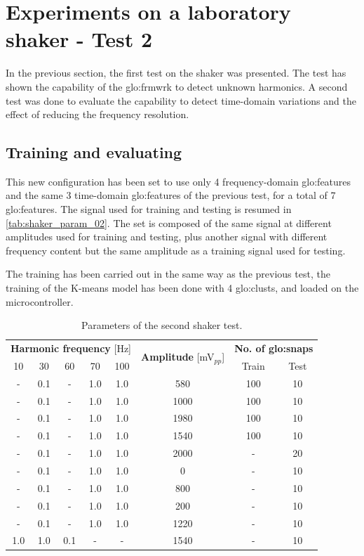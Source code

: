\section{Experiments on a laboratory shaker - Test 2}
\label{sec:shaker_test02}
In the previous section, the first test on the shaker was presented. The test has shown the capability of the \gls{glo:frmwrk} to detect unknown harmonics. A second test was done to evaluate the capability to detect time-domain variations and the effect of reducing the frequency resolution. 

\subsection{Training and evaluating}
This new configuration has been set to use only 4 frequency-domain \gls{glo:feature}s and the same 3 time-domain \gls{glo:feature}s of the previous test, for a total of 7 \gls{glo:feature}s. The signal used for training and testing is resumed in \autoref{tab:shaker_param_02}. The set is composed of the same signal at different amplitudes used for training and testing, plus another signal with different frequency content but the same amplitude as a training signal used for testing. 

The training has been carried out in the same way as the previous test, the training of the K-means model has been done with 4 \gls{glo:clust}s, and loaded on the microcontroller. 

\begin{table}
    \centering
    \caption{Parameters of the second shaker test.}
    \label{tab:shaker_param_02}
    \begin{tabular}{cccccccc} 
    \toprule
    \multicolumn{5}{c}{\textbf{Harmonic frequency} {[}Hz]} & \multirow{2}{*}{\textbf{Amplitude }{[}mV$_{pp}$]} & \multicolumn{2}{c}{\textbf{ No. of \gls{glo:snap}s}} \\
    10 & 30 & 60 & 70 & 100 &  & Train & Test \\ 
    \hline
    - & 0.1 & - & 1.0 & 1.0 & 580 & 100 & 10 \\
    - & 0.1 & - & 1.0 & 1.0 & 1000 & 100 & 10 \\
    - & 0.1 & - & 1.0 & 1.0 & 1980 & 100 & 10 \\
    - & 0.1 & - & 1.0 & 1.0 & 1540 & 100 & 10 \\
    - & 0.1 & - & 1.0 & 1.0 & 2000 & - & 20 \\
    - & 0.1 & - & 1.0 & 1.0 & 0 & - & 10 \\
    - & 0.1 & - & 1.0 & 1.0 & 800 & - & 10 \\
    - & 0.1 & - & 1.0 & 1.0 & 200 & - & 10 \\
    - & 0.1 & - & 1.0 & 1.0 & 1220 & - & 10 \\
    1.0 & 1.0 & 0.1 & - & - & 1540 & - & 10 \\
    \bottomrule
    \end{tabular}
    \end{table}



